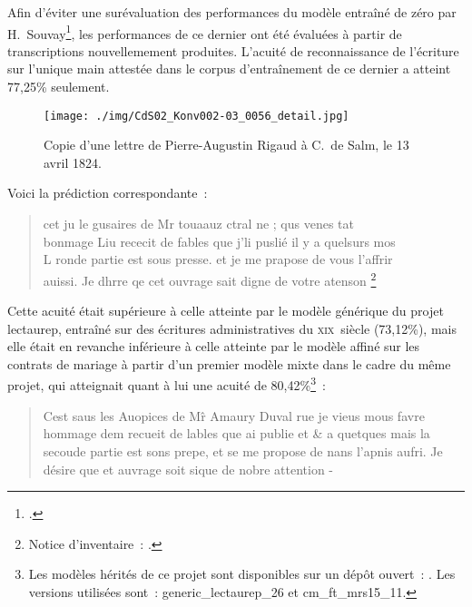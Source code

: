 \documentclass[a4paper,12pt,twoside]{book}
\newcommand{\siecle}[1]{\textsc{#1}\ieme}
\begin{document}
				Afin d'éviter une surévaluation des performances du modèle entraîné de zéro par H.~Souvay\footcite{souvayCorrespondanceConstanceSalm2021}, les performances de ce dernier ont été évaluées à partir de transcriptions nouvellemement produites. L'acuité de reconnaissance de l'écriture sur l'unique main attestée dans le corpus d'entraînement de ce dernier a atteint 77,25\% seulement. 
				
				\begin{figure}[!h]
					\centering
					\texttt{[image: ./img/CdS02\_Konv002-03\_0056\_detail.jpg]}%
					\caption{Copie d'une lettre de Pierre-Augustin Rigaud à C.~de Salm, le 13 avril 1824.}%
					\label{lettre-rigaud}%
				\end{figure}
				
				Voici la prédiction correspondante~:
				
				\begin{quote}
					\textsf{cet ju le gusaires de Mr touaauz ctral ne ; qus venes tat\\
					bonmage Liu rececit de fables que j'li puslié il y a quelsurs mos\\
					L ronde partie est sous presse. et je me prapose de vous l'affrir\\
					auissi. Je dhrre qe cet ouvrage sait digne de votre atenson
					\footnote{Notice d'inventaire~: \cite{CdS02056}.}}
				\end{quote}
				
				Cette acuité était supérieure à celle atteinte par le modèle générique du projet \gls{lectaurep}, entraîné sur des écritures administratives du \siecle{xix}~siècle (73,12\%), mais elle était en revanche inférieure à celle atteinte par le modèle affiné sur les contrats de mariage à partir d'un premier modèle mixte dans le cadre du même projet, qui atteignait quant à lui une acuité de 80,42\%\footnote{Les modèles hérités de ce projet sont disponibles sur un dépôt ouvert~: \cite{KrakenModelsTranscription}. Les versions utilisées sont~: \textsf{generic\_lectaurep\_26} et \textsf{cm\_ft\_mrs15\_11}.}~:
				
				\begin{quote}
					\textsf{Cest saus les Auopices de M\^r Amaury Duval rue je vieus mous favre
					hommage dem recueit de lables que ai publie et \& a quetques mais
					la secoude partie est sons prepe, et se me propose de nans l'apnis
					aufri. Je désire que et auvrage soit sique de nobre attention -}
				\end{quote}
				
\end{document}

